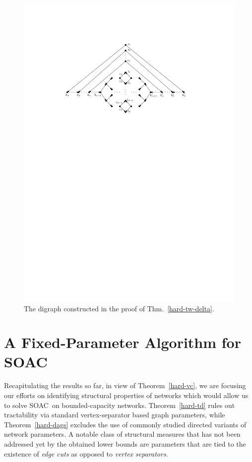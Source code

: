 \documentclass[letterpaper]{article} %
\newcommand{\problem}{{\sc SOAC}\xspace} %
\begin{document}
\begin{figure}
\begin{center}
\includegraphics[scale=0.64]{tw_deg_red}
\end{center}
\caption{The digraph constructed in the proof of Thm.~\ref{hard-tw-delta}.}
\label{fig:tw_deg_red}
\end{figure}

\section{A Fixed-Parameter Algorithm for \problem}

Recapitulating the results so far, in view of Theorem~\ref{hard-vc}, we are focusing our efforts on identifying structural properties of networks which would allow us to solve \problem\ on bounded-capacity networks. Theorem~\ref{hard-td} rules out tractability via standard vertex-separator based graph parameters, while Theorem~\ref{hard-dags} excludes the use of commonly studied directed variants of network parameters. A notable class of structural measures that has not been addressed yet by the obtained lower bounds are parameters that are tied to the existence of \emph{edge cuts} as opposed to \emph{vertex separators}.
\end{document}
